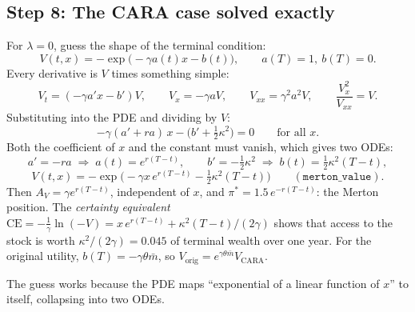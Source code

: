 \documentclass[11pt]{article}
\newcommand{\mb}{\bar m}
\begin{document}
\subsection*{Step 8: The CARA case solved exactly}
For $\lambda=0$, guess the shape of the terminal condition:
\[
  V(t,x) = -\exp\bigl(-\gamma a(t)x - b(t)\bigr),\qquad a(T)=1,\ b(T)=0 .
\]
Every derivative is $V$ times something simple:
\[
  V_t = (-\gamma a'x - b')V,\qquad V_x = -\gamma aV,\qquad V_{xx}=\gamma^2a^2V,
  \qquad \frac{V_x^2}{V_{xx}} = V .
\]
Substituting into the PDE and dividing by $V$:
\[
  -\gamma(a'+ra)\,x - \bigl(b'+\tfrac12\kappa^2\bigr) = 0\qquad\text{for all }x .
\]
Both the coefficient of $x$ and the constant must vanish, which gives two ODEs:
\[
  a' = -ra \;\Rightarrow\; a(t)=e^{r(T-t)},\qquad
  b' = -\tfrac12\kappa^2 \;\Rightarrow\; b(t)=\tfrac12\kappa^2(T-t),
\]
\[
  V(t,x) = -\exp\!\bigl(-\gamma x\,e^{r(T-t)} - \tfrac12\kappa^2(T-t)\bigr)
  \qquad(\texttt{merton\_value}).
\]
Then $A_V=\gamma e^{r(T-t)}$, independent of $x$, and $\pi^*=1.5\,e^{-r(T-t)}$: the Merton
position. The \emph{certainty equivalent}
$\mathrm{CE}=-\tfrac1\gamma\ln(-V)=x\,e^{r(T-t)}+\kappa^2(T-t)/(2\gamma)$ shows that access
to the stock is worth $\kappa^2/(2\gamma)=0.045$ of terminal wealth over one year. For the
original utility, $b(T)=-\gamma\theta\mb$, so $V_{\text{orig}}=e^{\gamma\theta\mb}V_{\text{CARA}}$.

The guess works because the PDE maps ``exponential of a linear function of $x$'' to itself,
collapsing into two ODEs.
\end{document}

